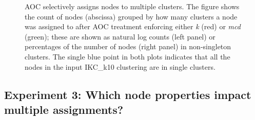 \documentclass[12pt, oneside]{article}   	%
\begin{document}
\begin{figure}[H]
\begin{subfigure}[t]{0.48\textwidth}
    	\end{subfigure}
\captionsetup{width=0.9\textwidth}	
\caption{AOC selectively assigns nodes to multiple clusters. The figure shows the count of nodes (abscissa) grouped by how many clusters a node was assigned to after AOC treatment enforcing either \emph{k} (red) or \emph{mcd} (green);  these are shown as natural log counts (left panel) or percentages of the number of nodes (right panel) in non-singleton clusters. The single blue point in both plots indicates that all the nodes in the input IKC\_k10 clustering are in single clusters.}
\label{fig:fig2}
\end{figure}

\subsection{Experiment 3: Which node properties impact multiple assignments?}
\end{document}

